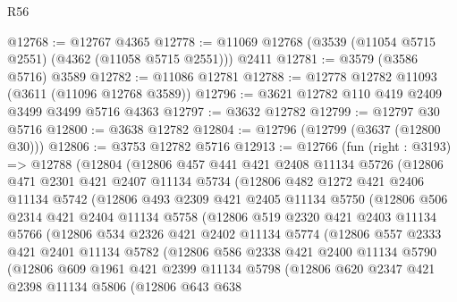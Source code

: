 \begin{lexlean}{R56}
\begin{coremodule}
@12768 := @12767 @4365
@12778 := @11069 @12768 (@3539 (@11054 @5715 @2551) (@4362 (@11058 @5715 @2551))) @2411
@12781 := @3579 (@3586 @5716) @3589
@12782 := @11086 @12781
@12788 := @12778 @12782 @11093 (@3611 (@11096 @12768 @3589))
@12796 := @3621 @12782 @110 @419 @2409 @3499 @3499 @5716 @4363
@12797 := @3632 @12782
@12799 := @12797 @30 @5716
@12800 := @3638 @12782
@12804 := @12796 (@12799 (@3637 (@12800 @30)))
@12806 := @3753 @12782 @5716
@12913 := @12766
    (fun (right : @3193) =>
    @12788
      (@12804
        (@12806
          @457
          @441
          @421
          @2408
          @11134
          @5726
          (@12806
            @471
            @2301
            @421
            @2407
            @11134
            @5734
            (@12806
              @482
              @1272
              @421
              @2406
              @11134
              @5742
              (@12806
                @493
                @2309
                @421
                @2405
                @11134
                @5750
                (@12806
                  @506
                  @2314
                  @421
                  @2404
                  @11134
                  @5758
                  (@12806
                    @519
                    @2320
                    @421
                    @2403
                    @11134
                    @5766
                    (@12806
                      @534
                      @2326
                      @421
                      @2402
                      @11134
                      @5774
                      (@12806
                        @557
                        @2333
                        @421
                        @2401
                        @11134
                        @5782
                        (@12806
                          @586
                          @2338
                          @421
                          @2400
                          @11134
                          @5790
                          (@12806
                            @609
                            @1961
                            @421
                            @2399
                            @11134
                            @5798
                            (@12806
                              @620
                              @2347
                              @421
                              @2398
                              @11134
                              @5806
                              (@12806
                                @643
                                @638

\end{coremodule}
\end{lexlean}
